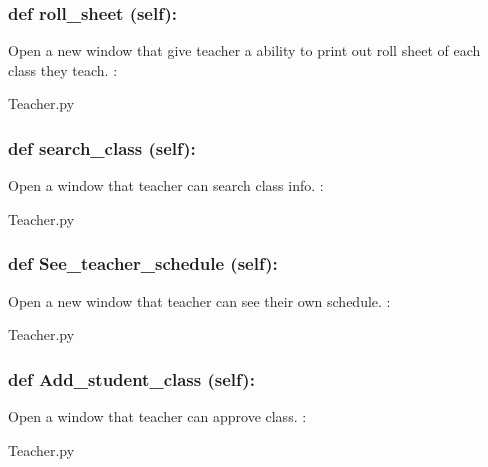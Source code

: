 \hypertarget{class_poly_a14a7ad77ce612b0c54f531d307ee4b39}{
\subsubsection[{def roll_sheet (self):}]{\setlength{\rightskip}{0pt plus 5cm}def {roll\_sheet} (self):}}\label{class_poly_a14a7ad77ce612b0c54f531d307ee4b39}
Open a new window that give teacher a ability to print out roll sheet of each class they teach.
:\begin{DoxyCompactItemize}
\item 
Teacher.\-py\end{DoxyCompactItemize}

\hypertarget{class_poly_a14a7ad77ce612b0c54f531d307ee4b39}{
\subsubsection[{def search_class (self):}]{\setlength{\rightskip}{0pt plus 5cm}def {search\_class} (self):}}\label{class_poly_a14a7ad77ce612b0c54f531d307ee4b39}
Open a window that teacher can search class info.
:\begin{DoxyCompactItemize}
\item 
Teacher.\-py\end{DoxyCompactItemize}

\hypertarget{class_poly_a14a7ad77ce612b0c54f531d307ee4b39}{
\subsubsection[{def See_teacher_schedule (self):}]{\setlength{\rightskip}{0pt plus 5cm}def {See\_teacher\_schedule} (self):}}\label{class_poly_a14a7ad77ce612b0c54f531d307ee4b39}
Open a new window that teacher can see their own schedule.
:\begin{DoxyCompactItemize}
\item 
Teacher.\-py\end{DoxyCompactItemize}

\hypertarget{class_poly_a14a7ad77ce612b0c54f531d307ee4b39}{
\subsubsection[{def Add_student_class (self):}]{\setlength{\rightskip}{0pt plus 5cm}def {Add\_student\_class} (self):}}\label{class_poly_a14a7ad77ce612b0c54f531d307ee4b39}
Open a window that teacher can approve class.
:\begin{DoxyCompactItemize}
\item 
Teacher.\-py\end{DoxyCompactItemize}

